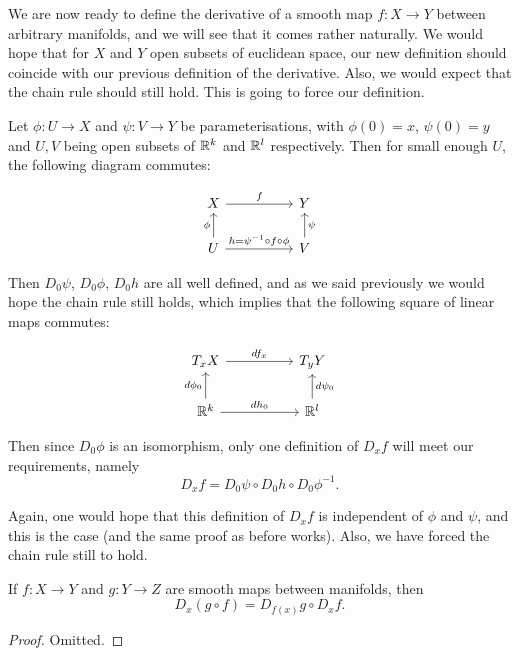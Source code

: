 \documentclass[a4paper, 10pt, twocolumn]{amsart}
\begin{document}
We are now ready to define the derivative of a smooth map $f: X \rightarrow Y$ between arbitrary manifolds, and we will see that it comes rather naturally. We would hope that for $X$ and $Y$ open subsets of euclidean space, our new definition should coincide with our previous definition of the derivative. Also, we would expect that the chain rule should still hold. This is going to force our definition.

Let $\phi: U \rightarrow X$ and $\psi: V \rightarrow Y$ be parameterisations, with $\phi(0) = x$, $\psi(0) = y$ and $U, V$ being open subsets of $\mathbb{R}^k$ and $\mathbb{R}^l$ respectively. Then for small enough $U$, the following diagram commutes:

\[\begin{tikzcd}
	X && Y \\
	U && V
	\arrow["f", from=1-1, to=1-3]
	\arrow["\phi", from=2-1, to=1-1]
	\arrow["\psi"', from=2-3, to=1-3]
	\arrow["{h=\psi^{-1} \circ f \circ \phi}", from=2-1, to=2-3]
\end{tikzcd}\]

Then $D_0 \psi$, $D_0 \phi$, $D_0 h$ are all well defined, and as we said previously we would hope the chain rule still holds, which implies that the following square of linear maps commutes:

\[\begin{tikzcd}
	{T_xX} && {T_yY} \\
	{\R^k} && {\R^l}
	\arrow["{df_x}", from=1-1, to=1-3]
	\arrow["{d\phi_0}", from=2-1, to=1-1]
	\arrow["{d\psi_0}"', from=2-3, to=1-3]
	\arrow["{dh_0}", from=2-1, to=2-3]
\end{tikzcd}\]

Then since $D_0 \phi$ is an isomorphism, only one definition of $D_x f$ will meet our requirements, namely
$$
D_x f = D_0 \psi \circ D_0 h \circ D_0 \phi^{-1}.
$$

Again, one would hope that this definition of $D_x f$ is independent of $\phi$ and $\psi$, and this is the case (and the same proof as before works). Also, we have forced the chain rule still to hold.

\begin{theorem}
    If $f: X \rightarrow Y$ and $g: Y \rightarrow Z$ are smooth maps between manifolds, then
    $$
    D_x(g \circ f) = D_{f(x)} g \circ D_x f.
    $$
\end{theorem}
\begin{proof}
    Omitted.
\end{proof}
\end{document}
